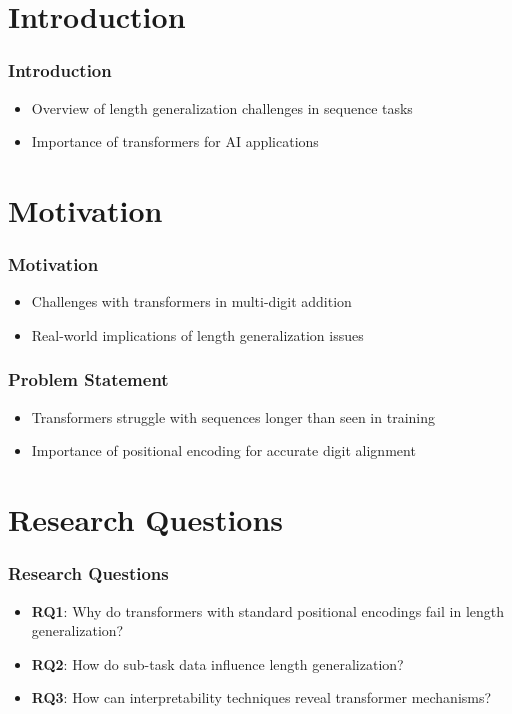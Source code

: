 \documentclass[14pt,aspectratio=169]{beamer}
\institute{Universit\"at Hamburg\\\trinstitute}
\title{\trtitle}
\author{\trauthor}
\date{}
\theoremstyle{remark}
\begin{document}
\begin{frame}[plain]
    \titlepage
\end{frame}


\section{Introduction}

\begin{frame}
    \frametitle{Introduction}
    \begin{itemize}
        \item Overview of length generalization challenges in sequence tasks
        \item Importance of transformers for AI applications
    \end{itemize}
\end{frame}

\section{Motivation}

\begin{frame}
    \frametitle{Motivation}
    \begin{itemize}
        \item Challenges with transformers in multi-digit addition
        \item Real-world implications of length generalization issues
    \end{itemize}
\end{frame}

\begin{frame}
    \frametitle{Problem Statement}
    \begin{itemize}
        \item Transformers struggle with sequences longer than seen in training
        \item Importance of positional encoding for accurate digit alignment
    \end{itemize}
\end{frame}

\section{Research Questions}

\begin{frame}
    \frametitle{Research Questions}
    \begin{itemize}
        \item \textbf{RQ1}: Why do transformers with standard positional encodings fail in length generalization?
        \item \textbf{RQ2}: How do sub-task data influence length generalization?
        \item \textbf{RQ3}: How can interpretability techniques reveal transformer mechanisms?
    \end{itemize}
\end{frame}
\end{document}
